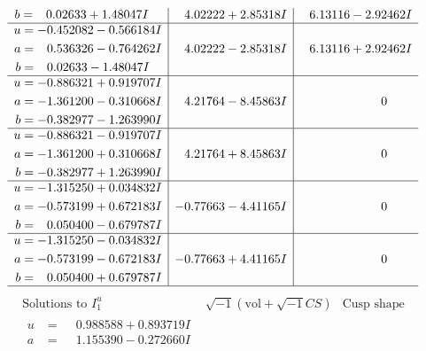\documentclass[1p]{elsarticle_modified}
\theoremstyle{definition}
\newcommand{\I}{\sqrt{-1}}
\begin{document}
$$\begin{array}{c|c|c}
\begin{aligned}
b &= \phantom{-}0.02633 + 1.48047 I\end{aligned}
 & \phantom{-}4.02222 + 2.85318 I & \phantom{-}6.13116 - 2.92462 I \\ \hline\begin{aligned}
u &= -0.452082 - 0.566184 I \\
a &= \phantom{-}0.536326 - 0.764262 I \\
b &= \phantom{-}0.02633 - 1.48047 I\end{aligned}
 & \phantom{-}4.02222 - 2.85318 I & \phantom{-}6.13116 + 2.92462 I \\ \hline\begin{aligned}
u &= -0.886321 + 0.919707 I \\
a &= -1.361200 - 0.310668 I \\
b &= -0.382977 - 1.263990 I\end{aligned}
 & \phantom{-}4.21764 - 8.45863 I & \phantom{-0.000000 } 0 \\ \hline\begin{aligned}
u &= -0.886321 - 0.919707 I \\
a &= -1.361200 + 0.310668 I \\
b &= -0.382977 + 1.263990 I\end{aligned}
 & \phantom{-}4.21764 + 8.45863 I & \phantom{-0.000000 } 0 \\ \hline\begin{aligned}
u &= -1.315250 + 0.034832 I \\
a &= -0.573199 + 0.672183 I \\
b &= \phantom{-}0.050400 - 0.679787 I\end{aligned}
 & -0.77663 - 4.41165 I & \phantom{-0.000000 } 0 \\ \hline\begin{aligned}
u &= -1.315250 - 0.034832 I \\
a &= -0.573199 - 0.672183 I \\
b &= \phantom{-}0.050400 + 0.679787 I\end{aligned}
 & -0.77663 + 4.41165 I & \phantom{-0.000000 } 0\\
 \hline 
 \end{array}$$\newpage$$\begin{array}{c|c|c}  
\text{Solutions to }I^u_{1}& \I (\text{vol} + \sqrt{-1}CS) & \text{Cusp shape}\\
 \hline 
\begin{aligned}
u &= \phantom{-}0.988588 + 0.893719 I \\
a &= \phantom{-}1.155390 - 0.272660 I \\

\end{aligned}
\end{array}$$
\end{document}
